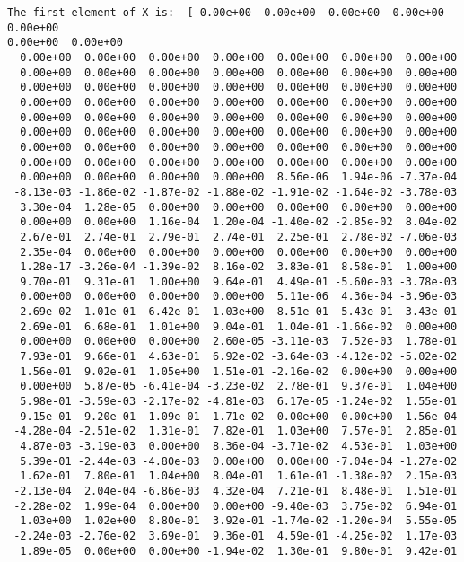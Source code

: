 \documentclass[11pt]{article}
\begin{document}
    \begin{Verbatim}[commandchars=\\\{\}]
The first element of X is:  [ 0.00e+00  0.00e+00  0.00e+00  0.00e+00  0.00e+00
0.00e+00  0.00e+00
  0.00e+00  0.00e+00  0.00e+00  0.00e+00  0.00e+00  0.00e+00  0.00e+00
  0.00e+00  0.00e+00  0.00e+00  0.00e+00  0.00e+00  0.00e+00  0.00e+00
  0.00e+00  0.00e+00  0.00e+00  0.00e+00  0.00e+00  0.00e+00  0.00e+00
  0.00e+00  0.00e+00  0.00e+00  0.00e+00  0.00e+00  0.00e+00  0.00e+00
  0.00e+00  0.00e+00  0.00e+00  0.00e+00  0.00e+00  0.00e+00  0.00e+00
  0.00e+00  0.00e+00  0.00e+00  0.00e+00  0.00e+00  0.00e+00  0.00e+00
  0.00e+00  0.00e+00  0.00e+00  0.00e+00  0.00e+00  0.00e+00  0.00e+00
  0.00e+00  0.00e+00  0.00e+00  0.00e+00  0.00e+00  0.00e+00  0.00e+00
  0.00e+00  0.00e+00  0.00e+00  0.00e+00  8.56e-06  1.94e-06 -7.37e-04
 -8.13e-03 -1.86e-02 -1.87e-02 -1.88e-02 -1.91e-02 -1.64e-02 -3.78e-03
  3.30e-04  1.28e-05  0.00e+00  0.00e+00  0.00e+00  0.00e+00  0.00e+00
  0.00e+00  0.00e+00  1.16e-04  1.20e-04 -1.40e-02 -2.85e-02  8.04e-02
  2.67e-01  2.74e-01  2.79e-01  2.74e-01  2.25e-01  2.78e-02 -7.06e-03
  2.35e-04  0.00e+00  0.00e+00  0.00e+00  0.00e+00  0.00e+00  0.00e+00
  1.28e-17 -3.26e-04 -1.39e-02  8.16e-02  3.83e-01  8.58e-01  1.00e+00
  9.70e-01  9.31e-01  1.00e+00  9.64e-01  4.49e-01 -5.60e-03 -3.78e-03
  0.00e+00  0.00e+00  0.00e+00  0.00e+00  5.11e-06  4.36e-04 -3.96e-03
 -2.69e-02  1.01e-01  6.42e-01  1.03e+00  8.51e-01  5.43e-01  3.43e-01
  2.69e-01  6.68e-01  1.01e+00  9.04e-01  1.04e-01 -1.66e-02  0.00e+00
  0.00e+00  0.00e+00  0.00e+00  2.60e-05 -3.11e-03  7.52e-03  1.78e-01
  7.93e-01  9.66e-01  4.63e-01  6.92e-02 -3.64e-03 -4.12e-02 -5.02e-02
  1.56e-01  9.02e-01  1.05e+00  1.51e-01 -2.16e-02  0.00e+00  0.00e+00
  0.00e+00  5.87e-05 -6.41e-04 -3.23e-02  2.78e-01  9.37e-01  1.04e+00
  5.98e-01 -3.59e-03 -2.17e-02 -4.81e-03  6.17e-05 -1.24e-02  1.55e-01
  9.15e-01  9.20e-01  1.09e-01 -1.71e-02  0.00e+00  0.00e+00  1.56e-04
 -4.28e-04 -2.51e-02  1.31e-01  7.82e-01  1.03e+00  7.57e-01  2.85e-01
  4.87e-03 -3.19e-03  0.00e+00  8.36e-04 -3.71e-02  4.53e-01  1.03e+00
  5.39e-01 -2.44e-03 -4.80e-03  0.00e+00  0.00e+00 -7.04e-04 -1.27e-02
  1.62e-01  7.80e-01  1.04e+00  8.04e-01  1.61e-01 -1.38e-02  2.15e-03
 -2.13e-04  2.04e-04 -6.86e-03  4.32e-04  7.21e-01  8.48e-01  1.51e-01
 -2.28e-02  1.99e-04  0.00e+00  0.00e+00 -9.40e-03  3.75e-02  6.94e-01
  1.03e+00  1.02e+00  8.80e-01  3.92e-01 -1.74e-02 -1.20e-04  5.55e-05
 -2.24e-03 -2.76e-02  3.69e-01  9.36e-01  4.59e-01 -4.25e-02  1.17e-03
  1.89e-05  0.00e+00  0.00e+00 -1.94e-02  1.30e-01  9.80e-01  9.42e-01

\end{Verbatim}
\end{document}
